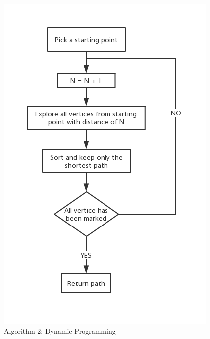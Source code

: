 \begin{itemize}
\begin{figure}[h]
\includegraphics[width=\linewidth]{Method2.png}
\caption{Algorithm 2: Dynamic Programming}
\label{fig3}
\end{figure}
\begin{figure}[h]

\end{figure}
\end{itemize}

